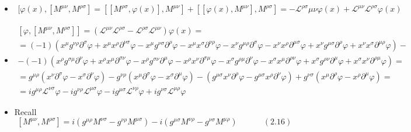 \documentclass[twoside]{amsart}
\begin{document}
\begin{itemize}
\[\]
\item[(d)] \[
\begin{gathered}
  [ \varphi(x) , [ M^{\mu \nu }, M^{\rho \sigma} ] = [[ M^{\rho \sigma}, \varphi(x) ], M^{\mu \nu } ] + [[ \varphi(x), M^{\mu \nu } ], M^{\rho \sigma} ] = - \mathcal{L}^{\rho \sigma} \mathcal{ \mu \nu } \varphi(x) + \mathcal{L}^{\mu \nu } \mathcal{L}^{\rho \sigma} \varphi(x)
\end{gathered}
\] 
\item[(e)]
\[
\begin{gathered}
  [ \varphi, [ M^{\mu \nu}, M^{\rho \sigma} ] ] = ( \mathcal{L}^{\mu \nu} \mathcal{L}^{\rho \sigma} -  \mathcal{L}^{\rho \sigma} \mathcal{L}^{\mu \nu} ) \varphi(x) = \\
  = (-1) ( x^{\mu} g^{\nu \rho } \partial^{\sigma} \varphi + x^{\mu } x^{\rho} \partial^{\nu \sigma} \varphi - x^{\mu} g^{\nu \sigma} \partial^{\rho} \varphi - x^{\mu} x^{\sigma} \partial^{\nu \rho} \varphi - x^{\nu} g^{\mu \rho} \partial^{\sigma} \varphi - x^{\nu} x^{ \rho} \partial^{\mu \sigma} \varphi + x^{\nu} g^{\mu \sigma} \partial^{\rho} \varphi + x^{\nu} x^{\sigma} \partial^{\mu \rho} \varphi ) - \\
  -(-1) ( x^{\rho} g^{\sigma \mu} \partial^{\nu} \varphi + x^{\rho} x^{\mu} \partial^{\sigma \nu } \varphi - x^{\rho } g^{\sigma \nu } \partial^{\mu} \varphi - x^{\rho} x^{\nu} \partial^{\sigma \mu} \varphi - x^{\sigma} g^{\rho \mu} \partial^{\nu} \varphi - x^{\sigma} x^{ \mu} \partial^{\rho \nu} \varphi + x^{\sigma} g^{\rho \nu} \partial^{\mu} \varphi + x^{\sigma} x^{\nu} \partial^{\rho \mu} \varphi ) = \\
  = g^{\mu \rho} ( x^{\nu} \partial^{\sigma} \varphi - x^{\sigma} \partial^{\nu} \varphi ) - g^{\nu \rho} ( x^{\mu} \partial^{\sigma} \varphi - x^{\sigma} \partial^{\mu} \varphi) - (g^{\mu \sigma} x^{\nu} \partial^{\rho} \varphi - g^{\mu \sigma} x^{\rho} \partial^{\nu} \varphi) + g^{\nu \sigma} ( x^{\mu} \partial^{\rho} \varphi - x^{\rho} \partial^{\mu} \varphi ) = \\
  = i g^{\mu \rho} \mathcal{L}^{\nu \sigma} \varphi - ig^{\nu \rho} \mathcal{L}^{\mu \sigma} \varphi - ig^{\mu \sigma} \mathcal{L}^{\nu \rho} \varphi + i g^{\nu \sigma} \mathcal{L}^{\mu \rho } \varphi
\end{gathered}
\]
\item[(f)] Recall
\[
[ M^{\mu \nu}, M^{\rho \sigma} ] = i ( g^{\mu \rho } M^{\nu \sigma} - g^{\nu \rho } M^{\mu \sigma } ) - i ( g^{\mu \sigma} M^{\nu \rho } - g^{ \nu \sigma} M^{\mu \rho } ) \quad \quad \quad \, (2.16)
\]
\end{itemize}
\end{document}
